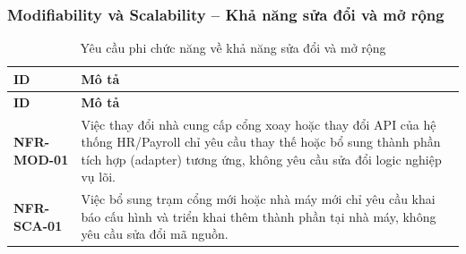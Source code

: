 \subsubsection{Modifiability và Scalability -- Khả năng sửa đổi và mở rộng}
\begingroup
\small
\renewcommand{\arraystretch}{1.2}
\begin{longtable}{|>{\centering\arraybackslash}m{3cm}|>{\raggedright\arraybackslash}m{12.9cm}|}
    \caption{Yêu cầu phi chức năng về khả năng sửa đổi và mở rộng}\label{tab:nfr-modifiability}\\
    \hline
    \textbf{ID} & \textbf{Mô tả}\\
    \hline
    \endfirsthead
    \hline
    \textbf{ID} & \textbf{Mô tả}\\
    \hline
    \endhead
    \hline
    \endfoot
    \hline
    \endlastfoot
    \textbf{NFR-MOD-01} & Việc thay đổi nhà cung cấp cổng xoay hoặc thay đổi API của hệ thống HR/Payroll chỉ yêu cầu thay thế hoặc bổ sung thành phần tích hợp (adapter) tương ứng, không yêu cầu sửa đổi logic nghiệp vụ lõi.\\
    \hline
    \textbf{NFR-SCA-01} & Việc bổ sung trạm cổng mới hoặc nhà máy mới chỉ yêu cầu khai báo cấu hình và triển khai thêm thành phần tại nhà máy, không yêu cầu sửa đổi mã nguồn.\\
    \hline
\end{longtable}
\endgroup
